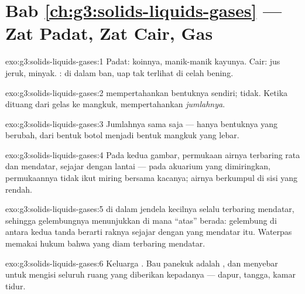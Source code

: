 \section*{Bab \ref{ch:g3:solids-liquids-gases} --- Zat Padat, Zat Cair, Gas}

\begin{solution}{exo:g3:solids-liquids-gases:1}
Padat: koinnya, manik-manik kayunya. Cair: jus jeruk, minyak. :
 di dalam ban, uap tak terlihat di celah bening.
\end{solution}

\begin{solution}{exo:g3:solids-liquids-gases:2}
 mempertahankan bentuknya sendiri;  tidak. Ketika
dituang dari gelas ke mangkuk,  mempertahankan
\emph{jumlahnya}.
\end{solution}

\begin{solution}{exo:g3:solids-liquids-gases:3}
Jumlahnya sama saja --- hanya bentuknya yang berubah, dari bentuk
botol menjadi bentuk mangkuk yang lebar.
\end{solution}

\begin{solution}{exo:g3:solids-liquids-gases:4}
Pada kedua gambar, permukaan airnya terbaring rata dan mendatar,
sejajar dengan lantai --- pada akuarium yang dimiringkan, permukaannya
tidak ikut miring bersama kacanya; airnya berkumpul di sisi yang
rendah.
\end{solution}

\begin{solution}{exo:g3:solids-liquids-gases:5}
 di dalam jendela kecilnya selalu terbaring mendatar, sehingga
gelembungnya menunjukkan di mana ``atas'' berada: gelembung di antara
kedua tanda berarti raknya sejajar dengan  yang mendatar itu.
Waterpas memakai hukum bahwa  yang diam terbaring mendatar.
\end{solution}

\begin{solution}{exo:g3:solids-liquids-gases:6}
Keluarga . Bau panekuk adalah , dan  menyebar untuk mengisi
seluruh ruang yang diberikan kepadanya --- dapur, tangga, kamar tidur.
\end{solution}


